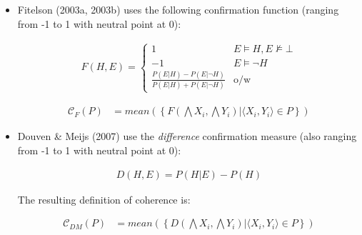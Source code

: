\documentclass[10pt,]{scrartcl}
\begin{document}
\begin{itemize}

\item Fitelson (2003a, 2003b) uses the following confirmation function (ranging from -1 to 1 with neutral point at 0):

\begin{align*}
    F(H,E) = \begin{cases}
    1 & E\models H, E\not \models \bot \\
    -1 & E \models \neg H\\
    \frac{P(E|H)-P(E|\neg H)}{P(E|H)+P(E|\neg H)} & \mbox{o/w}
    \end{cases}
\end{align*}

\begin{align}
\tag{Fitelson}  
    \mathcal{C}_{F}(P) & =
mean\left(\left\{F(\bigwedge X_i, \bigwedge Y_i) | \langle X_i, Y_i\rangle \in P\right\} \right)
\end{align}






\item  Douven \&
Meijs (2007)  use the \textit{difference} confirmation measure (also ranging from -1 to 1 with neutral point at 0):

\begin{align*}
    D(H,E) = P(H|E) - P(H)
\end{align*}

The resulting definition of coherence is:

\begin{align}
\tag{DM}  
    \mathcal{C}_{DM}(P) & =
mean\left(\left\{D(\bigwedge X_i, \bigwedge Y_i) | \langle X_i, Y_i\rangle \in P\right\} \right)
\end{align}



\end{itemize}
\end{document}
